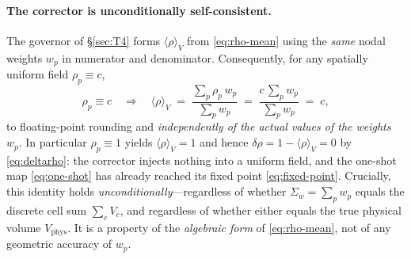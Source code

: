 \documentclass[11pt]{article}
\theoremstyle{definition}
\theoremstyle{remark}
\begin{document}
\paragraph{The corrector is unconditionally self-consistent.}
The governor of \S\ref{sec:T4} forms $\langle\rho\rangle_V$ from
\eqref{eq:rho-mean} using the \emph{same} nodal weights $w_p$ in numerator and
denominator. Consequently, for any spatially uniform field $\rho_p\equiv c$,
\begin{equation}
\rho_p\equiv c
\quad\Longrightarrow\quad
\langle\rho\rangle_V
\;=\;\frac{\sum_p \rho_p\,w_p}{\sum_p w_p}
\;=\;\frac{c\,\sum_p w_p}{\sum_p w_p}
\;=\;c ,
\label{eq:disc-selfconsistency}
\end{equation}
to floating-point rounding and \emph{independently of the actual values of the
weights} $w_p$. In particular $\rho_p\equiv 1$ yields $\langle\rho\rangle_V=1$ and
hence $\delta\rho=1-\langle\rho\rangle_V=0$ by \eqref{eq:deltarho}: the corrector
injects nothing into a uniform field, and the one-shot map \eqref{eq:one-shot} has
already reached its fixed point \eqref{eq:fixed-point}. Crucially, this identity
holds \emph{unconditionally}---regardless of whether $\Sigma_w=\sum_p w_p$ equals
the discrete cell sum $\sum_c V_c$, and regardless of whether either equals the
true physical volume $V_{\mathrm{phys}}$. It is a property of the \emph{algebraic
form} of \eqref{eq:rho-mean}, not of any geometric accuracy of $w_p$.
\end{document}
